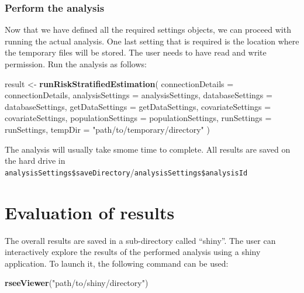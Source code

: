 \documentclass[]{article}
\newenvironment{Shaded}{\begin{snugshade}}{\end{snugshade}}
\newcommand{\DataTypeTok}[1]{\textcolor[rgb]{0.13,0.29,0.53}{#1}}
\newcommand{\KeywordTok}[1]{\textcolor[rgb]{0.13,0.29,0.53}{\textbf{#1}}}
\newcommand{\NormalTok}[1]{#1}
\newcommand{\StringTok}[1]{\textcolor[rgb]{0.31,0.60,0.02}{#1}}
\begin{document}
\hypertarget{perform-the-analysis}{%
\subsubsection{Perform the analysis}\label{perform-the-analysis}}

Now that we have defined all the required settings objects, we can
proceed with running the actual analysis. One last setting that is
required is the location where the temporary files will be stored. The
user needs to have read and write permission. Run the analysis as
follows:

\begin{Shaded}
\begin{Highlighting}[]
\NormalTok{result <{-}}\StringTok{ }\KeywordTok{runRiskStratifiedEstimation}\NormalTok{(}
  \DataTypeTok{connectionDetails =}\NormalTok{ connectionDetails,}
  \DataTypeTok{analysisSettings =}\NormalTok{ analysisSettings,}
  \DataTypeTok{databaseSettings =}\NormalTok{ databaseSettings,}
  \DataTypeTok{getDataSettings =}\NormalTok{ getDataSettings,}
  \DataTypeTok{covariateSettings =}\NormalTok{ covariateSettings,}
  \DataTypeTok{populationSettings =}\NormalTok{ populationSettings,}
  \DataTypeTok{runSettings =}\NormalTok{ runSettings,}
  \DataTypeTok{tempDir =} \StringTok{"path/to/temporary/directory"}
\NormalTok{)}
\end{Highlighting}
\end{Shaded}

The analysis will usually take smome time to complete. All results are
saved on the hard drive in
\texttt{analysisSettings\$saveDirectory}/\texttt{analysisSettings\$analysisId}

\hypertarget{evaluation-of-results}{%
\section{Evaluation of results}\label{evaluation-of-results}}

The overall results are saved in a sub-directory called ``shiny''. The
user can interactively explore the results of the performed analysis
using a shiny application. To launch it, the following command can be
used:

\begin{Shaded}
\begin{Highlighting}[]
\KeywordTok{rseeViewer}\NormalTok{(}\StringTok{"path/to/shiny/directory"}\NormalTok{)}
\end{Highlighting}
\end{Shaded}
\end{document}
